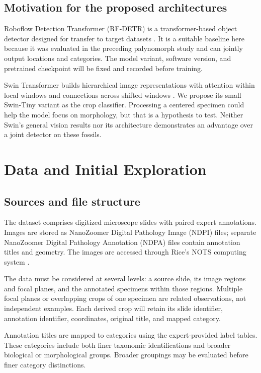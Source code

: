 \documentclass[conference,letterpaper]{IEEEtran}
\begin{document}
\subsection{Motivation for the proposed architectures}
Roboflow Detection Transformer (RF-DETR) is a transformer-based object detector designed for transfer to target datasets \cite{robinson2026}. It is a suitable baseline here because it was evaluated in the preceding palynomorph study and can jointly output locations and categories. The model variant, software version, and pretrained checkpoint will be fixed and recorded before training.

Swin Transformer builds hierarchical image representations with attention within local windows and connections across shifted windows \cite{liu2021}. We propose its small Swin-Tiny variant as the crop classifier. Processing a centered specimen could help the model focus on morphology, but that is a hypothesis to test. Neither Swin's general vision results nor its architecture demonstrates an advantage over a joint detector on these fossils.

\section{Data and Initial Exploration}
\subsection{Sources and file structure}
The dataset comprises \SlideCount{} digitized microscope slides with paired expert annotations. Images are stored as NanoZoomer Digital Pathology Image (NDPI) files; separate NanoZoomer Digital Pathology Annotation (NDPA) files contain annotation titles and geometry. The images are accessed through Rice's NOTS computing system \cite{inventory2026}.

The data must be considered at several levels: a source slide, its image regions and focal planes, and the annotated specimens within those regions. Multiple focal planes or overlapping crops of one specimen are related observations, not independent examples. Each derived crop will retain its slide identifier, annotation identifier, coordinates, original title, and mapped category.

Annotation titles are mapped to categories using the expert-provided label tables. These categories include both finer taxonomic identifications and broader biological or morphological groups. Broader groupings may be evaluated before finer category distinctions.
\end{document}

